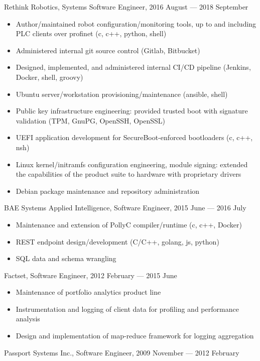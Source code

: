 \documentclass[letterpaper,11pt]{article}
\begin{document}
Rethink Robotics, Systems Software Engineer, 2016 August --- 2018 September

\begin{itemize}
\item Author/maintained robot configuration/monitoring tools, up to and
  including PLC clients over profinet (c, c++, python, shell)
\item Administered internal git source control (Gitlab, Bitbucket)
\item Designed, implemented, and administered internal CI/CD pipeline (Jenkins,
  Docker, shell, groovy)
\item Ubuntu server/workstation provisioning/maintenance (ansible, shell)
\item Public key infrastructure engineering: provided trusted boot with
  signature validation (TPM, GnuPG, OpenSSH, OpenSSL)
\item UEFI application development for SecureBoot-enforced bootloaders (c, c++,
  nsh)
\item Linux kernel/initramfs configuration engineering, module signing:
  extended the capabilities of the product suite to hardware with proprietary
  drivers
\item Debian package maintenance and repository administration
\end{itemize}

BAE Systems Applied Intelligence, Software Engineer, 2015 June --- 2016 July

\begin{itemize}
\item Maintenance and extension of PollyC compiler/runtime (c, c++, Docker)
\item REST endpoint design/development (C/C++, golang, js, python)
\item SQL data and schema wrangling
\end{itemize}

Factset, Software Engineer, 2012 February --- 2015 June

\begin{itemize}
\item Maintenance of portfolio analytics product line
\item Instrumentation and logging of client data for profiling and performance analysis
\item Design and implementation of map-reduce framework for logging aggregation
\end{itemize}

Passport Systems Inc., Software Engineer, 2009 November --- 2012 February
\end{document}
